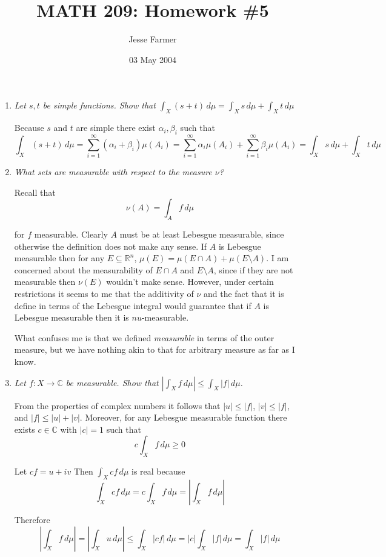 \documentclass[11pt]{article}
\title{MATH 209: Homework \#5}
\author{Jesse Farmer}
\date{03 May 2004}
\newcommand{\C}{\mathbb{C}}
\newcommand{\R}{\mathbb{R}}
\begin{document}
\maketitle
\begin{enumerate}
\item \emph{Let $s,t$ be simple functions.  Show that $\int_X (s+t) \, d\mu = \int_X s \, d\mu + \int_X t \, d\mu$}

Because $s$ and $t$ are simple there exist $\alpha_i, \beta_i$ such that
\[
\int_X (s+t) \, d\mu = \sum_{i=1}^\infty (\alpha_i + \beta_i) \mu\left(A_i\right) = \sum_{i=1}^\infty \alpha_i \mu\left(A_i\right) + \sum_{i=1}^\infty\beta_i \mu\left(A_i\right) = \int_X s \,d\mu + \int_X t \,d\mu
\]

\item \emph{What sets are measurable with respect to the measure $\nu$?}

Recall that
\[
\nu(A) = \int_A f \,d\mu
\]

for $f$ measurable.  Clearly $A$ must be at least Lebesgue measurable, since otherwise the definition does not make any sense.  If $A$ is Lebesgue measurable then for any $E \subseteq \R^n$, $\mu(E) = \mu(E \cap A) + \mu(E \setminus A)$.  I am concerned about the measurability of $E \cap A$ and $E \setminus A$, since if they are not measurable then $\nu(E)$ wouldn't make sense.  However, under certain restrictions it seems to me that the additivity of $\nu$ and the fact that it is define in terms of the Lebesgue integral would guarantee that if $A$ is Lebesgue measurable then it is $nu$-measurable.

What confuses me is that we defined \emph{measurable} in terms of the outer measure, but we have nothing akin to that for arbitrary measure as far as I know.

\item \emph{Let $f: X \rightarrow \C$ be measurable.  Show that $|\int_X f \,d\mu| \leq \int_X |f| \,d\mu$.}

From the properties of complex numbers it follows that  $|u| \leq |f|$, $|v| \leq |f|$, and $|f| \leq |u| + |v|$.  Moreover, for any Lebesgue measurable function there exists $c \in \C$ with $|c| = 1$ such that
\[
c \int_X f \,d\mu \geq 0
\]

Let $cf = u + iv$  Then $\int_X cf \,d\mu$ is real because
\[
\int_X cf \,d\mu = c\int_X f \,d\mu = \left|\int_X f \,d\mu\right|
\]

Therefore
\[
\left|\int_X f \,d\mu\right| = \left|\int_X u \,d\mu\right| \leq \int_X |cf| \,d\mu =|c|\int_X |f| \,d\mu = \int_X |f| \,d\mu
\]


\end{enumerate}
\end{document}
